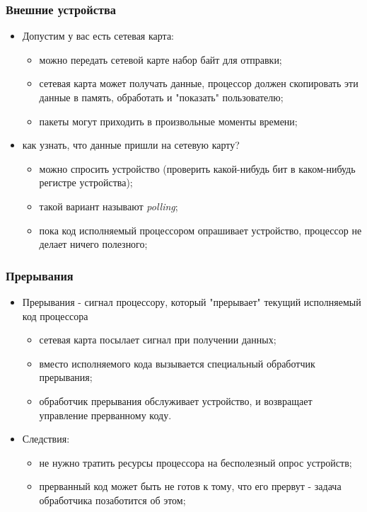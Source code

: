 \begin{frame}
\frametitle{Внешние устройства}
\begin{itemize}
  \item Допустим у вас есть сетевая карта:
  \begin{itemize}
    \item можно передать сетевой карте набор байт для отправки;
    \item сетевая карта может получать данные, процессор должен скопировать эти
    данные в память, обработать и "показать" пользователю;
    \item пакеты могут приходить в произвольные моменты времени;
  \end{itemize}
  \item как узнать, что данные пришли на сетевую карту?
  \begin{itemize}
    \item можно спросить устройство (проверить какой-нибудь бит в каком-нибудь
    регистре устройства);
    \item такой вариант называют \emph{polling};
    \item пока код исполняемый процессором опрашивает устройство, процессор не
    делает ничего полезного;
  \end{itemize}
\end{itemize}
\end{frame}

\begin{frame}
\frametitle{Прерывания}
\begin{itemize}
  \item Прерывания - сигнал процессору, который "прерывает" текущий исполняемый
  код процессора
  \begin{itemize}
    \item сетевая карта посылает сигнал при получении данных;
    \item вместо исполняемого кода вызывается специальный обработчик прерывания;
    \item обработчик прерывания обслуживает устройство, и возвращает управление
    прерванному коду.
  \end{itemize}
  \item Следствия:
  \begin{itemize}
    \item не нужно тратить ресурсы процессора на бесполезный опрос устройств;
    \item прерванный код может быть не готов к тому, что его прервут - задача
    обработчика позаботится об этом;
  \end{itemize}
\end{itemize}
\end{frame}

